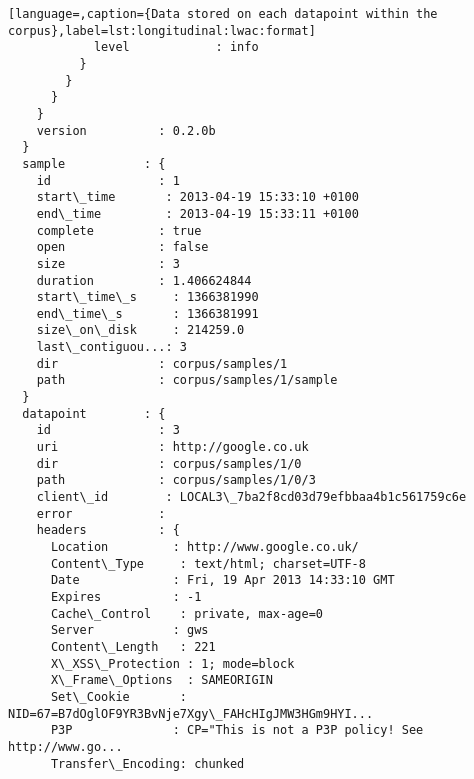 \begin{lstlisting}[language=,caption={Data stored on each datapoint within the corpus},label=lst:longitudinal:lwac:format]
            level            : info                                              
          }
        }
      }
    }
    version          : 0.2.0b                                            
  }
  sample           : {
    id               : 1                                                 
    start\_time       : 2013-04-19 15:33:10 +0100                         
    end\_time         : 2013-04-19 15:33:11 +0100                         
    complete         : true                                              
    open             : false                                             
    size             : 3                                                 
    duration         : 1.406624844                                       
    start\_time\_s     : 1366381990                                        
    end\_time\_s       : 1366381991                                        
    size\_on\_disk     : 214259.0                                          
    last\_contiguou...: 3                                                 
    dir              : corpus/samples/1                                  
    path             : corpus/samples/1/sample                           
  }
  datapoint        : {
    id               : 3                                                 
    uri              : http://google.co.uk                               
    dir              : corpus/samples/1/0                                
    path             : corpus/samples/1/0/3                              
    client\_id        : LOCAL3\_7ba2f8cd03d79efbbaa4b1c561759c6e           
    error            :                                                   
    headers          : {
      Location         : http://www.google.co.uk/                          
      Content\_Type     : text/html; charset=UTF-8                          
      Date             : Fri, 19 Apr 2013 14:33:10 GMT                     
      Expires          : -1                                                
      Cache\_Control    : private, max-age=0                                
      Server           : gws                                               
      Content\_Length   : 221                                               
      X\_XSS\_Protection : 1; mode=block                                     
      X\_Frame\_Options  : SAMEORIGIN                                        
      Set\_Cookie       : NID=67=B7dOglOF9YR3BvNje7Xgy\_FAHcHIgJMW3HGm9HYI...
      P3P              : CP="This is not a P3P policy! See http://www.go...
      Transfer\_Encoding: chunked                                           

\end{lstlisting}
